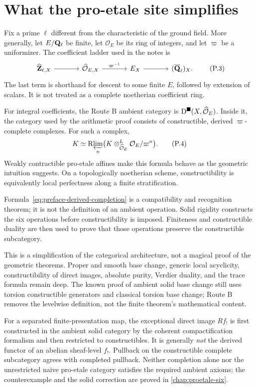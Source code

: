 \section*{What the pro-etale site simplifies}

Fix a prime \(\ell\) different from the characteristic of the ground field.
More generally, let \(E/\mathbf Q_\ell\) be finite, let \(\mathcal O_E\) be its ring of
integers, and let \(\varpi\) be a uniformizer.  The coefficient ladder used in
the notes is
\[
\begin{tikzcd}[column sep=large]
 \widehat{\mathbf Z}_{\ell,X}
   \arrow[r] &
 \widehat{\mathcal O}_{E,X}
   \arrow[r,"\varpi^{-1}"] &
 E_X
   \arrow[r] &
 (\Qbarl)_X .
\end{tikzcd}
\tag{P.3}\label{eq:preface-coefficient-ladder}
\]
The last term is shorthand for descent to some finite \(E\), followed by
extension of scalars.  It is not treated as a complete noetherian coefficient
ring.

For integral coefficients, the Route B ambient category is
\(\mathrm D^{\blacksquare}(X,\widehat{\mathcal O}_E)\).  Inside it, the category used by the
arithmetic proof consists of constructible, derived
\(\varpi\)-complete complexes.  For such a complex,
\[
  K\simeq
  \mathrm R\!\varprojlim_n\bigl(K\otimes^L_{\widehat{\mathcal O}_E}
                    \mathcal O_E/\varpi^n\bigr).
\tag{P.4}\label{eq:preface-derived-completion}
\]
Weakly contractible pro-etale affines make this formula behave as the
geometric intuition suggests.  On a topologically noetherian scheme,
constructibility is equivalently local perfectness along a finite
stratification.

Formula~\eqref{eq:preface-derived-completion} is a compatibility and
recognition theorem; it is not the definition of an ambient operation.
Solid rigidity constructs the six operations before constructibility is
imposed.  Finiteness and constructible duality are then used to prove that
those operations preserve the constructible subcategory.

This is a simplification of the categorical architecture, not a magical
proof of the geometric theorems.  Proper and smooth base change, generic
local acyclicity, constructibility of direct images, absolute purity,
Verdier duality, and the trace formula remain deep.  The known proof of
ambient solid base change still uses torsion constructible generators and
classical torsion base change; Route B removes the levelwise definition, not
the finite theorem's mathematical content.

\begin{auditbox}
For a separated finite-presentation map, the exceptional direct image
\(Rf_!\) is first constructed in the ambient solid category by the coherent
compactification formalism and then restricted to constructibles.  It is
generally \emph{not} the derived functor of an abelian sheaf-level \(f_!\).
Pullback on the constructible complete subcategory agrees with completed
pullback.  Neither completion alone nor the unrestricted naive pro-etale
category satisfies the required ambient axioms; the counterexample and the
solid correction are proved in \cref{chap:proetale-six}.
\end{auditbox}

